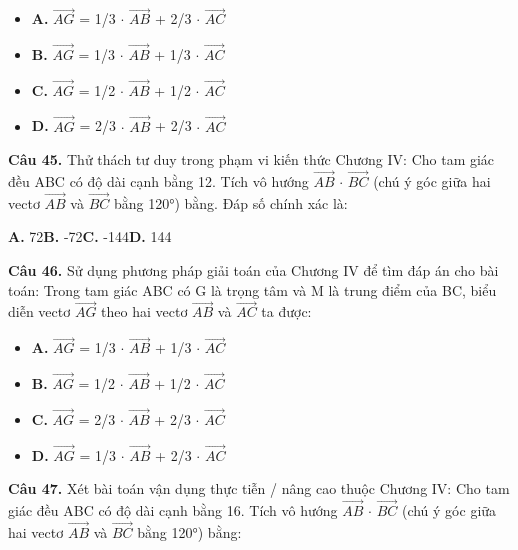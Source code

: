 \documentclass[11pt,a4paper]{article}
\begin{document}
\begin{itemize}\setlength{\itemsep}{1pt}\setlength{\parskip}{0pt}
  \item[] \textbf{A.} $\overrightarrow{AG}$ = 1/3 $\cdot$ $\overrightarrow{AB}$ + 2/3 $\cdot$ $\overrightarrow{AC}$
  \item[] \textbf{B.} $\overrightarrow{AG}$ = 1/3 $\cdot$ $\overrightarrow{AB}$ + 1/3 $\cdot$ $\overrightarrow{AC}$
  \item[] \textbf{C.} $\overrightarrow{AG}$ = 1/2 $\cdot$ $\overrightarrow{AB}$ + 1/2 $\cdot$ $\overrightarrow{AC}$
  \item[] \textbf{D.} $\overrightarrow{AG}$ = 2/3 $\cdot$ $\overrightarrow{AB}$ + 2/3 $\cdot$ $\overrightarrow{AC}$
\end{itemize}\vspace{2pt}
\textbf{\color{primary} Câu 45.} Thử thách tư duy trong phạm vi kiến thức Chương IV: Cho tam giác đều ABC có độ dài cạnh bằng 12. Tích vô hướng $\overrightarrow{AB}$ $\cdot$ $\overrightarrow{BC}$ (chú ý góc giữa hai vectơ $\overrightarrow{AB}$ và $\overrightarrow{BC}$ bằng 120°) bằng. Đáp số chính xác là:\par
\hspace*{1.5em}\textbf{A.} 72\quad\quad \textbf{B.} -72\quad\quad \textbf{C.} -144\quad\quad \textbf{D.} 144\par\vspace{2pt}
\textbf{\color{primary} Câu 46.} Sử dụng phương pháp giải toán của Chương IV để tìm đáp án cho bài toán: Trong tam giác ABC có G là trọng tâm và M là trung điểm của BC, biểu diễn vectơ $\overrightarrow{AG}$ theo hai vectơ $\overrightarrow{AB}$ và $\overrightarrow{AC}$ ta được:\par
\begin{itemize}\setlength{\itemsep}{1pt}\setlength{\parskip}{0pt}
  \item[] \textbf{A.} $\overrightarrow{AG}$ = 1/3 $\cdot$ $\overrightarrow{AB}$ + 1/3 $\cdot$ $\overrightarrow{AC}$
  \item[] \textbf{B.} $\overrightarrow{AG}$ = 1/2 $\cdot$ $\overrightarrow{AB}$ + 1/2 $\cdot$ $\overrightarrow{AC}$
  \item[] \textbf{C.} $\overrightarrow{AG}$ = 2/3 $\cdot$ $\overrightarrow{AB}$ + 2/3 $\cdot$ $\overrightarrow{AC}$
  \item[] \textbf{D.} $\overrightarrow{AG}$ = 1/3 $\cdot$ $\overrightarrow{AB}$ + 2/3 $\cdot$ $\overrightarrow{AC}$
\end{itemize}\vspace{2pt}
\textbf{\color{primary} Câu 47.} Xét bài toán vận dụng thực tiễn / nâng cao thuộc Chương IV: Cho tam giác đều ABC có độ dài cạnh bằng 16. Tích vô hướng $\overrightarrow{AB}$ $\cdot$ $\overrightarrow{BC}$ (chú ý góc giữa hai vectơ $\overrightarrow{AB}$ và $\overrightarrow{BC}$ bằng 120°) bằng:\par
\end{document}
